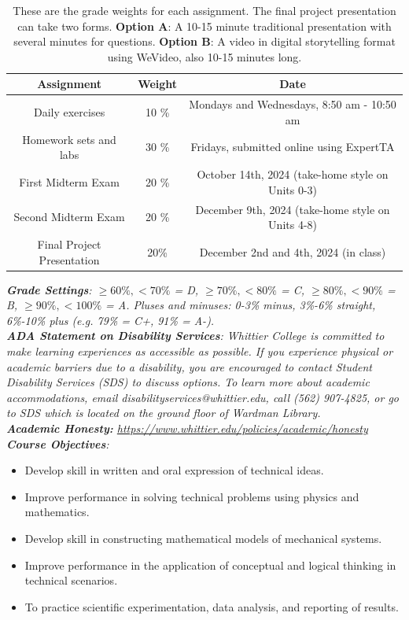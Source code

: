 \documentclass[10pt]{article}
\begin{document}
\begin{table}
\centering
\begin{tabular}{| c | c | c |}
\hline
\textbf{Assignment} & \textbf{Weight} & \textbf{Date} \\ \hline
Daily exercises & 10 \% & Mondays and Wednesdays, 8:50 am - 10:50 am\\ \hline
Homework sets and labs & 30 \% & Fridays, submitted online using ExpertTA \\ \hline
First Midterm Exam & 20 \% & October 14th, 2024 (take-home style on Units 0-3) \\ \hline
Second Midterm Exam & 20 \% & December 9th, 2024 (take-home style on Units 4-8) \\ \hline
Final Project Presentation & 20\% & December 2nd and 4th, 2024 (in class) \\ \hline
\end{tabular}
\caption{\label{tab:grades} These are the grade weights for each assignment. The final project presentation can take two forms.  \textbf{Option A}: A 10-15 minute traditional presentation with several minutes for questions.  \textbf{Option B}: A video in digital storytelling format using WeVideo, also 10-15 minutes long.}
\end{table}
\noindent
\textit{\textbf{Grade Settings}: $\geq 60\%, <70\%$ = D, $\geq 70\%, <80\%$ = C, $\geq 80\%, <90\%$ = B, $\geq 90\%, <100\%$ = A. Pluses and minuses: 0-3\% minus, 3\%-6\% straight, 6\%-10\% plus (e.g. 79\% = C+, 91\% = A-).} \\
\textit{\textbf{ADA Statement on Disability Services}: Whittier College is committed to make learning experiences as accessible as possible. If you experience physical or academic barriers due to a disability, you are encouraged to contact Student Disability Services (SDS) to discuss options. To learn more about academic accommodations, email disabilityservices@whittier.edu, call (562) 907-4825, or go to SDS which is located on the ground floor of Wardman Library.} \\
\textit{\textbf{Academic Honesty:} \url{https://www.whittier.edu/policies/academic/honesty}} \\
\noindent
\textit{\textbf{Course Objectives}:}
\begin{itemize}
\item Develop skill in written and oral expression of technical ideas.
\item Improve performance in solving technical problems using physics and mathematics.
\item Develop skill in constructing mathematical models of mechanical systems.
\item Improve performance in the application of conceptual and logical thinking in technical scenarios.
\item To practice scientific experimentation, data analysis, and reporting of results.
\end{itemize}
\end{document}
